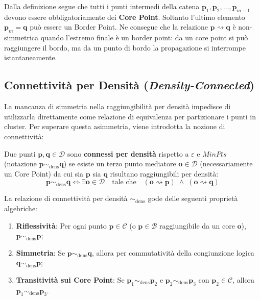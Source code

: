 \begin{remark}
Dalla definizione segue che tutti i punti intermedi della catena $\mathbf{p}_1, \mathbf{p}_2, \dots, \mathbf{p}_{m-1}$ devono essere obbligatoriamente dei \textbf{Core Point}. Soltanto l'ultimo elemento $\mathbf{p}_m = \mathbf{q}$ può essere un Border Point. Ne consegue che la relazione $\mathbf{p} \rightsquigarrow \mathbf{q}$ è non-simmetrica quando l'estremo finale è un border point: da un core point si può raggiungere il bordo, ma da un punto di bordo la propagazione si interrompe istantaneamente.
\end{remark}

\subsection{Connettività per Densità (\textit{Density-Connected})}

La mancanza di simmetria nella raggiungibilità per densità impedisce di utilizzarla direttamente come relazione di equivalenza per partizionare i punti in cluster. Per superare questa asimmetria, viene introdotta la nozione di connettività:

\begin{definition}
Due punti $\mathbf{p}, \mathbf{q} \in \mathcal{D}$ sono \textbf{connessi per densità} rispetto a $\varepsilon$ e $MinPts$ (notazione $\mathbf{p} \sim_{\mathrm{dens}} \mathbf{q}$) se esiste un terzo punto mediatore $\mathbf{o} \in \mathcal{D}$ (necessariamente un Core Point) da cui sia $\mathbf{p}$ sia $\mathbf{q}$ risultano raggiungibili per densità:
\begin{equation}
    \mathbf{p} \sim_{\mathrm{dens}} \mathbf{q} \iff \exists \mathbf{o} \in \mathcal{D} \quad \text{tale che} \quad (\mathbf{o} \rightsquigarrow \mathbf{p}) \;\land\; (\mathbf{o} \rightsquigarrow \mathbf{q})
    \label{eq:dm-density-connected}
\end{equation}
\end{definition}

\begin{property}
La relazione di connettività per densità $\sim_{\mathrm{dens}}$ gode delle seguenti proprietà algebriche:
\begin{enumerate}
    \item \textbf{Riflessività}: Per ogni punto $\mathbf{p} \in \mathcal{C}$ (o $\mathbf{p} \in \mathcal{B}$ raggiungibile da un core $\mathbf{o}$), $\mathbf{p} \sim_{\mathrm{dens}} \mathbf{p}$;
    \item \textbf{Simmetria}: Se $\mathbf{p} \sim_{\mathrm{dens}} \mathbf{q}$, allora per commutatività della congiunzione logica $\mathbf{q} \sim_{\mathrm{dens}} \mathbf{p}$;
    \item \textbf{Transitività sui Core Point}: Se $\mathbf{p}_1 \sim_{\mathrm{dens}} \mathbf{p}_2$ e $\mathbf{p}_2 \sim_{\mathrm{dens}} \mathbf{p}_3$ con $\mathbf{p}_2 \in \mathcal{C}$, allora $\mathbf{p}_1 \sim_{\mathrm{dens}} \mathbf{p}_3$.
\end{enumerate}
\end{property}

